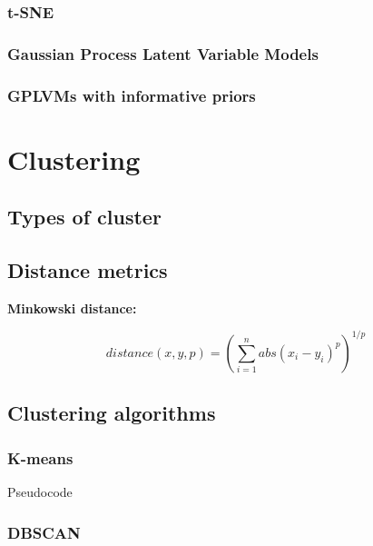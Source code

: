 \documentclass[]{book}
\theoremstyle{definition}
\theoremstyle{definition}
\theoremstyle{remark}
\begin{document}
\subsection{t-SNE}\label{t-sne}

\subsection{Gaussian Process Latent Variable
Models}\label{gaussian-process-latent-variable-models}

\subsection{GPLVMs with informative
priors}\label{gplvms-with-informative-priors}

\chapter{Clustering}\label{clustering}

\section{Types of cluster}\label{types-of-cluster}

\section{Distance metrics}\label{distance-metrics}

\textbf{Minkowski distance:}

\begin{equation}
  distance\left(x,y,p\right)=\left(\sum_{i=1}^{n} abs(x_i-y_i)^p\right)^{1/p}
  \label{eq:minkowski}
\end{equation}

\section{Clustering algorithms}\label{clustering-algorithms}

\subsection{K-means}\label{k-means}

Pseudocode

\subsection{DBSCAN}\label{dbscan}
\end{document}
